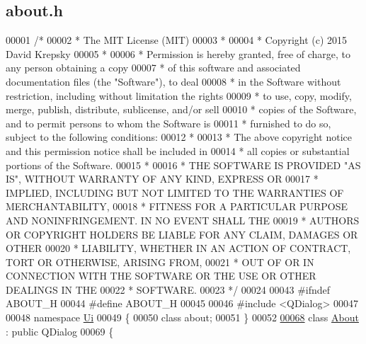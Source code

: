 \hypertarget{about_8h_source}{}\subsection{about.\+h}
\label{about_8h_source}

\begin{DoxyCode}
00001 \textcolor{comment}{/*}
00002 \textcolor{comment}{ * The MIT License (MIT)}
00003 \textcolor{comment}{ *}
00004 \textcolor{comment}{ * Copyright (c) 2015 David Krepsky}
00005 \textcolor{comment}{ *}
00006 \textcolor{comment}{ * Permission is hereby granted, free of charge, to any person obtaining a copy}
00007 \textcolor{comment}{ * of this software and associated documentation files (the "Software"), to deal}
00008 \textcolor{comment}{ * in the Software without restriction, including without limitation the rights}
00009 \textcolor{comment}{ * to use, copy, modify, merge, publish, distribute, sublicense, and/or sell}
00010 \textcolor{comment}{ * copies of the Software, and to permit persons to whom the Software is}
00011 \textcolor{comment}{ * furnished to do so, subject to the following conditions:}
00012 \textcolor{comment}{ *}
00013 \textcolor{comment}{ * The above copyright notice and this permission notice shall be included in}
00014 \textcolor{comment}{ * all copies or substantial portions of the Software.}
00015 \textcolor{comment}{ *}
00016 \textcolor{comment}{ * THE SOFTWARE IS PROVIDED "AS IS", WITHOUT WARRANTY OF ANY KIND, EXPRESS OR}
00017 \textcolor{comment}{ * IMPLIED, INCLUDING BUT NOT LIMITED TO THE WARRANTIES OF MERCHANTABILITY,}
00018 \textcolor{comment}{ * FITNESS FOR A PARTICULAR PURPOSE AND NONINFRINGEMENT. IN NO EVENT SHALL THE}
00019 \textcolor{comment}{ * AUTHORS OR COPYRIGHT HOLDERS BE LIABLE FOR ANY CLAIM, DAMAGES OR OTHER}
00020 \textcolor{comment}{ * LIABILITY, WHETHER IN AN ACTION OF CONTRACT, TORT OR OTHERWISE, ARISING FROM,}
00021 \textcolor{comment}{ * OUT OF OR IN CONNECTION WITH THE SOFTWARE OR THE USE OR OTHER DEALINGS IN THE}
00022 \textcolor{comment}{ * SOFTWARE.}
00023 \textcolor{comment}{ */}
00024 
00043 \textcolor{preprocessor}{#ifndef ABOUT\_H}
00044 \textcolor{preprocessor}{#define ABOUT\_H}
00045 
00046 \textcolor{preprocessor}{#include <QDialog>}
00047 
00048 \textcolor{keyword}{namespace }\hyperlink{namespace_ui}{Ui}
00049 \{
00050 \textcolor{keyword}{class }about;
00051 \}
00052 
\hypertarget{about_8h_source_l00068}{}\hyperlink{class_about}{00068} \textcolor{keyword}{class }\hyperlink{class_about}{About} : \textcolor{keyword}{public} QDialog
00069 \{

\end{DoxyCode}
